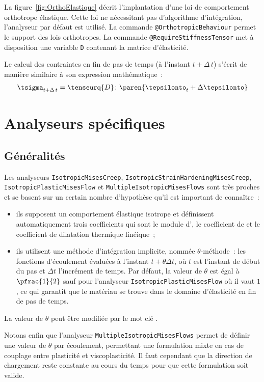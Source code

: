 \documentclass[rectoverso,pleiades,pstricks,leqno,anti]{texmf/note_technique_2010}
\makeatletter
\newcommand{\mkey}[1]{\index{mkeys}{#1@\symbol{64}#1}{\texttt{@#1}}}
\makeatother
\begin{document}
La figure~\ref{fig:OrthoElastique} décrit l'implantation d'une loi de
comportement orthotrope élastique. Cette loi ne nécessitant pas
d'algorithme d'intégration, l'analyseur par défaut est utilisé. La
commande \texttt{@Orthotropic\-Behaviour} permet le support des lois
orthotropes. La commande \texttt{@Require\-Stiff\-ness\-Tensor} met à
disposition une variable {\tt D} contenant la matrice d'élasticité.

Le calcul des contraintes en fin de pas de temps (à l'instant
\(t+\Delta\,t\)) s'écrit de manière similaire à son expression
mathématique~:
\[
\tsigma_{t+\Delta\,t} = \tenseurq{D}\colon\paren{\tepsilonto_{t}+\Delta\tepsilonto}
\]

\newpage
\clearpage
\section{Analyseurs spécifiques}

\subsection{Généralités}

Les analyseurs \texttt{Isotropic\-Mises\-Creep},
\texttt{Isotropic\-Strain\-Hardening\-Mises\-Creep},
\texttt{Isotropic\-Plastic\-Mises\-Flow} et
\texttt{Multiple\-Isotropic\-Mises\-Flows} sont très proches et se
basent sur un certain nombre d'hypothèse qu'il est important de
connaître~:
\begin{itemize}
  \item ils supposent un comportement élastique isotrope et définissent
  automatiquement trois coefficients qui sont le module d',
  le coefficient de  et le coefficient de dilatation
  thermique linéique~;
  \item ils utilisent une méthode d'intégration implicite, nommée
  \(\theta\)-méthode~: les fonctions d'écoulement évaluées à l'instant
  \(t+\theta\Delta t\), où \(t\) est l'instant de début du pas et
  \(\Delta t\) l'incrément de temps. Par défaut, la valeur de \(\theta\)
  est égal à \(\pfrac{1}{2}\) sauf pour l'analyseur
  \texttt{Isotropic\-Plastic\-Mises\-Flow} où il vaut \(1\), ce qui
  garantit que le matériau se trouve dans le domaine d'élasticité en fin
  de pas de temps.
\end{itemize}

La valeur de \(\theta\) peut être modifiée par le mot clé
\mkey{Theta}.

Notons enfin que l'analyseur \texttt{Multiple\-Isotropic\-Mises\-Flows}
permet de définir une valeur de \(\theta\) par écoulement, permettant
une formulation mixte en cas de couplage entre plasticité et
viscoplasticité. Il faut cependant que la direction de chargement reste
constante au cours du temps pour que cette formulation soit valide.
\end{document}

